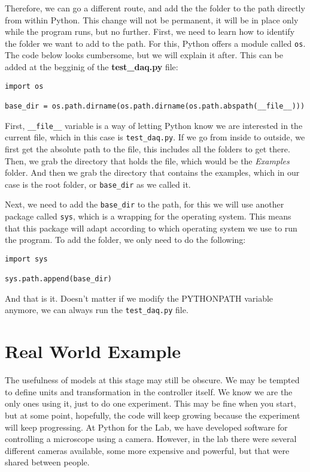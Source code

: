 Therefore, we can go a different route, and add the the folder to the path directly from within Python. This change will not be permanent, it will be in place only while the program runs, but no further. First, we need to learn how to identify the folder we want to add to the path. For this, Python offers a module called \texttt{os}. The code below looks cumbersome, but we will explain it after. This can be added at the begginig of the \textbf{test\_daq.py} file:

\begin{verbatim}
import os

base_dir = os.path.dirname(os.path.dirname(os.path.abspath(__file__)))
\end{verbatim} 

First, \texttt{\_\_file\_\_} variable is a way of letting Python know we are interested in the current file, which in this case is \texttt{test\_daq.py}. If we go from inside to outside, we first get the absolute path to the file, this includes all the folders to get there. Then, we grab the directory that holds the file, which would be the \emph{Examples} folder. And then we grab the directory that contains the examples, which in our case is the root folder, or \texttt{base\_dir} as we called it. 

Next, we need to add the \texttt{base\_dir} to the path, for this we will use another package called \texttt{sys}, which is a wrapping for the operating system. This means that this package will adapt according to which operating system we use to run the program. To add the folder, we only need to do the following:

\begin{verbatim}
import sys

sys.path.append(base_dir)
\end{verbatim}

And that is it. Doesn't matter if we modify the PYTHONPATH variable anymore, we can always run the \texttt{test\_daq.py} file. 


\section{Real World Example}\label{section:real-world-model}
The usefulness of models at this stage may still be obscure. We may be tempted to define units and transformation in the controller itself. We know we are the only ones using it, just to do one experiment. This may be fine when you start, but at some point, hopefully, the code will keep growing because the experiment will keep progressing. At Python for the Lab, we have developed software for controlling a microscope using a camera. However, in the lab there were several different cameras available, some more expensive and powerful, but that were shared between people. 

